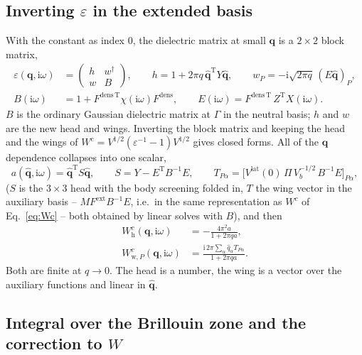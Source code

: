 \documentclass[11pt,a4paper]{article}
\newcommand{\bq}{\mathbf{q}}
\newcommand{\qhat}{\hat{\mathbf{q}}}
\newcommand{\ii}{\mathrm{i}}
\newcommand{\Tr}{\mathrm{T}}
\newcommand{\head}{\mathrm{h}}
\newcommand{\wing}{\mathrm{w}}
\newcommand{\lat}{\mathrm{lat}}
\newcommand{\dens}{\mathrm{dens}}
\newcommand{\ext}{\mathrm{ext}}
\begin{document}
\subsection{Inverting $\varepsilon$ in the extended basis}

With the constant as index 0, the dielectric matrix at small $\bq$ is a $2\times2$ block matrix,
\begin{align}
  \varepsilon(\bq,\ii\omega) &= \begin{pmatrix} h & w^\dagger\\ w & B\end{pmatrix},\qquad
  h = 1 + 2\pi q\,\qhat^\Tr Y\qhat,\qquad
  w_P = -\ii\sqrt{2\pi q}\,(E\qhat)_P,
  \label{eq:blocks}\\
  B(\ii\omega) &= 1 + F^{\dens\,\Tr}\chi(\ii\omega)F^\dens,\qquad
  E(\ii\omega) = F^{\dens\,\Tr}\,Z^\Tr X(\ii\omega).
  \label{eq:E}
\end{align}
$B$ is the ordinary Gaussian dielectric matrix at $\Gamma$ in the neutral basis; $h$ and $w$
are the new head and wings. Inverting the block matrix and keeping the head and the wings of
$W^c = V^{1/2}(\varepsilon^{-1}-1)V^{1/2}$ gives closed forms. All of the $\bq$ dependence
collapses into one scalar,
\begin{equation}
  a(\qhat,\ii\omega) = \qhat^\Tr S\qhat,\qquad
  S = Y - E^\Tr B^{-1}E,\qquad
  T_{P\alpha} = \big[V^\lat(0)\,\Pi\,V_b^{-1/2}\,B^{-1}E\big]_{P\alpha},
  \label{eq:ST}
\end{equation}
($S$ is the $3\times3$ head with the body screening folded in, $T$ the wing vector in the
auxiliary basis -- $M F^\ext B^{-1}E$, i.e.\ in the same representation as $W^c$ of
Eq.~\eqref{eq:Wc} -- both obtained by linear solves with $B$), and then
\begin{align}
  W^{c}_{\head}(\bq,\ii\omega) &= -\frac{4\pi^2 a}{1+2\pi q a},
  \label{eq:headwing}\\
  W^{c}_{\wing,P}(\bq,\ii\omega) &= \frac{\ii\,2\pi\sum_\alpha\hat q_\alpha T_{P\alpha}}{1+2\pi q a}.
  \label{eq:wing}
\end{align}
Both are finite at $q\to0$. The head is a number, the wing is a vector over the auxiliary
functions and linear in $\qhat$.

\subsection{Integral over the Brillouin zone and the correction to $W$}
\label{sec:DeltaW}
\end{document}
